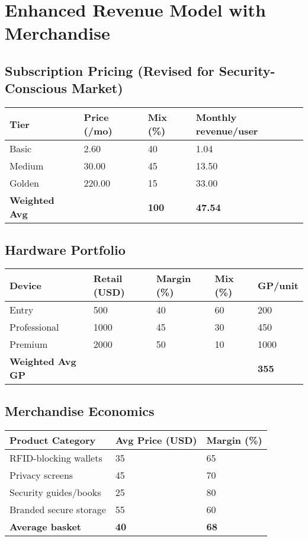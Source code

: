 \documentclass[11pt]{article}
\begin{document}
\section{Enhanced Revenue Model with Merchandise}

\subsection{Subscription Pricing (Revised for Security-Conscious Market)}
\begin{table}[htbp]
\centering
\begin{tabularx}{\linewidth}{l Y Y Y}
\toprule
Tier & Price (/mo) & Mix (\%) & Monthly revenue/user \\\midrule
Basic   & 2.60  & 40 & 1.04 \\
Medium  & 30.00 & 45 & 13.50 \\
Golden  & 220.00& 15 & 33.00 \\\midrule
\textbf{Weighted Avg} &  & \textbf{100} & \textbf{47.54} \\
\bottomrule
\end{tabularx}
\end{table}

\subsection{Hardware Portfolio}
\begin{table}[htbp]
\centering
\begin{tabularx}{\linewidth}{l Y Y Y Y}
\toprule
Device & Retail (USD) & Margin (\%) & Mix (\%) & GP/unit \\\midrule
Entry        & 500  & 40 & 60 & 200 \\
Professional & 1000 & 45 & 30 & 450 \\
Premium      & 2000 & 50 & 10 & 1000 \\\midrule
\textbf{Weighted Avg GP} &  &  &  & \textbf{355} \\
\bottomrule
\end{tabularx}
\end{table}

\subsection{Merchandise Economics}
\begin{table}[htbp]
\centering
\begin{tabularx}{\linewidth}{l Y Y}
\toprule
Product Category & Avg Price (USD) & Margin (\%) \\\midrule
RFID-blocking wallets & 35 & 65 \\
Privacy screens & 45 & 70 \\
Security guides/books & 25 & 80 \\
Branded secure storage & 55 & 60 \\
\textbf{Average basket} & \textbf{40} & \textbf{68} \\
\bottomrule
\end{tabularx}
\end{table}
\end{document}
